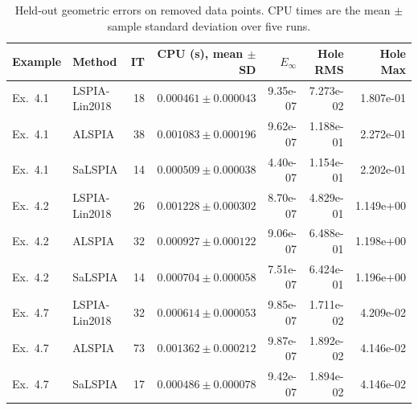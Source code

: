 \begin{table}[H]
\centering
\caption{Held-out geometric errors on removed data points. CPU times are the mean $\pm$ sample standard deviation over five runs.}
\label{tab:missing_heldout_error}
\begin{tabular}{llrrrrr}
\hline
Example & Method & IT & CPU (s), mean $\pm$ SD & $E_\infty$ & Hole RMS & Hole Max \\
\hline
Ex.~4.1 & LSPIA-Lin2018 & 18 & $0.000461 \pm 0.000043$ & 9.35e-07 & 7.273e-02 & 1.807e-01 \\
Ex.~4.1 & ALSPIA & 38 & $0.001083 \pm 0.000196$ & 9.62e-07 & 1.188e-01 & 2.272e-01 \\
Ex.~4.1 & SaLSPIA & 14 & $0.000509 \pm 0.000038$ & 4.40e-07 & 1.154e-01 & 2.202e-01 \\
Ex.~4.2 & LSPIA-Lin2018 & 26 & $0.001228 \pm 0.000302$ & 8.70e-07 & 4.829e-01 & 1.149e+00 \\
Ex.~4.2 & ALSPIA & 32 & $0.000927 \pm 0.000122$ & 9.06e-07 & 6.488e-01 & 1.198e+00 \\
Ex.~4.2 & SaLSPIA & 14 & $0.000704 \pm 0.000058$ & 7.51e-07 & 6.424e-01 & 1.196e+00 \\
Ex.~4.7 & LSPIA-Lin2018 & 32 & $0.000614 \pm 0.000053$ & 9.85e-07 & 1.711e-02 & 4.209e-02 \\
Ex.~4.7 & ALSPIA & 73 & $0.001362 \pm 0.000212$ & 9.87e-07 & 1.892e-02 & 4.146e-02 \\
Ex.~4.7 & SaLSPIA & 17 & $0.000486 \pm 0.000078$ & 9.42e-07 & 1.894e-02 & 4.146e-02 \\
\hline
\end{tabular}
\end{table}
